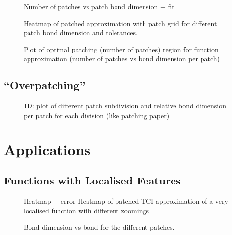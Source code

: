 \begin{figure}[ht!]
	\caption{Number of patches vs patch bond dimension + fit }
\end{figure}

\begin{figure}[ht!]
	\caption{Heatmap of patched approximation with patch grid for different patch bond dimension and tolerances.}
\end{figure}

\begin{figure}[ht!]
	\caption{Plot of optimal patching (number of patches) region for function approximation (number of patches vs bond dimension per patch)}
\end{figure}

\subsection{``Overpatching''}
\begin{figure}[ht!]
	\caption{1D: plot of different patch subdivision and relative bond dimension per patch for each division (like patching paper)  }
\end{figure}



\section{Applications}

\subsection{Functions with Localised Features}

\begin{figure}[ht!]
	\caption{Heatmap + error Heatmap of patched TCI approximation of a very localised function with different zoomings  }
\end{figure}

\begin{figure}[ht!]
	\caption{Bond dimension vs bond for the different patches. }
\end{figure}




